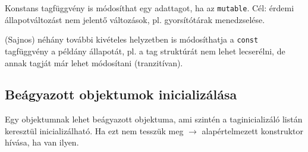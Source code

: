 \documentclass[usenames,dvipsnames,aspectratio=169]{beamer}
\begin{document}
\begin{frame}
    \begin{exampleblock}{}
        \scriptsize
        
    \end{exampleblock}
\end{frame}

\begin{frame}
    Konstans tagfüggvény is módosíthat egy adattagot, ha az \texttt{mutable}. Cél: érdemi állapotváltozást nem jelentő változások, pl. gyorsítótárak menedzselése.
    \begin{exampleblock}{}
        
    \end{exampleblock}
\end{frame}

\begin{frame}
    \begin{exampleblock}{}
        \scriptsize
        
    \end{exampleblock}
    (Sajnos) néhány további kivételes helyzetben is módosíthatja a \texttt{const} tagfüggvény a példány állapotát, pl.
    a tag struktúrát nem lehet lecserélni, de annak tagját már lehet módosítani (tranzitívan).
\end{frame}

\subsection{Beágyazott objektumok inicializálása}

\begin{frame}
    Egy objektumnak lehet beágyazott objektuma, ami szintén a taginicializáló listán keresztül inicializálható. Ha ezt nem tesszük meg $\to$ alapértelmezett konstruktor hívása, ha van ilyen.
    \begin{exampleblock}{}
        
    \end{exampleblock}
\end{frame}

\begin{frame}
    \begin{exampleblock}{}
        \scriptsize
        
    \end{exampleblock}
\end{frame}
\end{document}

